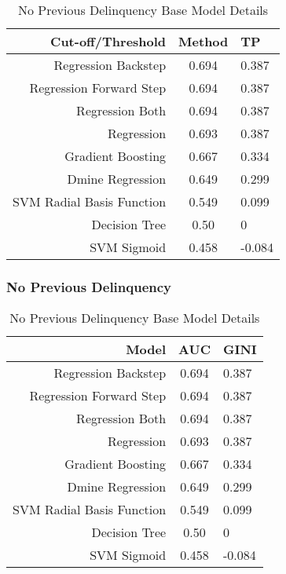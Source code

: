 \begin{table}[H]
	\centering
	\begin{tabular}{r | c | l}
		\hline
		\textbf{Cut-off/Threshold } & \textbf{Method} & \textbf{TP} \\
		\hline
		Regression Backstep          & 0.694        & 0.387 \\
		Regression Forward Step          & 0.694        & 0.387 \\
		Regression Both          & 0.694        & 0.387 \\
		Regression          & 0.693        & 0.387 \\
		Gradient Boosting          & 0.667        & 0.334 \\
		Dmine Regression          & 0.649        & 0.299 \\
		SVM Radial Basis Function          & 0.549        & 0.099 \\
		Decision Tree          & 0.50        & 0 \\
		SVM Sigmoid         & 0.458        & -0.084 \\
		\hline
	\end{tabular}
	\caption{No Previous Delinquency Base Model Details}
\end{table}

\subsubsection{No Previous Delinquency}

\begin{table}[H]
	\centering
	\begin{tabular}{r | c | l}
		\hline
		\textbf{Model} & \textbf{AUC} & \textbf{GINI} \\
		\hline
		Regression Backstep          & 0.694        & 0.387 \\
		Regression Forward Step          & 0.694        & 0.387 \\
		Regression Both          & 0.694        & 0.387 \\
		Regression          & 0.693        & 0.387 \\
		Gradient Boosting          & 0.667        & 0.334 \\
		Dmine Regression          & 0.649        & 0.299 \\
		SVM Radial Basis Function          & 0.549        & 0.099 \\
		Decision Tree          & 0.50        & 0 \\
		SVM Sigmoid         & 0.458        & -0.084 \\
		\hline
	\end{tabular}
	\caption{No Previous Delinquency Base Model Details}
\end{table}

